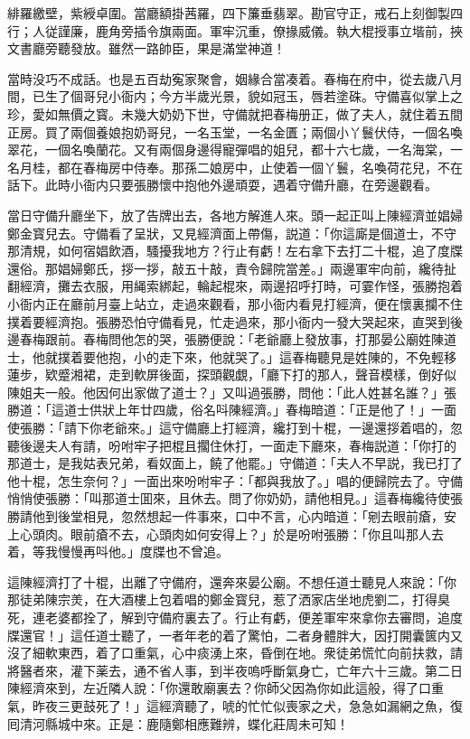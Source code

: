 緋羅繳壁，紫綬卓圍。當廳額掛茜羅，四下簾垂翡翠。勘官守正，戒石上刻御製四行；人従謹廉，鹿角旁插令旗兩面。軍牢沉重，僚掾威儀。執大棍授事立堦前，挾文書廳旁聽發放。雖然一路帥臣，果是滿堂神道！

當時没巧不成話。也是五百劫寃家聚會，姻緣合當凑着。春梅在府中，從去歲八月間，已生了個哥兒小衙内；今方半歲光景，貌如冠玉，唇若塗硃。守備喜似掌上之珍，愛如無價之寳。未幾大奶奶下世，守備就把春梅册正，做了夫人，就住着五間正房。買了兩個養娘抱奶哥兒，一名玉堂，一名金匱；兩個小丫鬟伏侍，一個名喚翠花，一個名喚蘭花。又有兩個身邊得寵彈唱的姐兒，都十六七歲，一名海棠，一名月桂，都在春梅房中侍奉。那孫二娘房中，止使着一個丫鬟，名喚荷花兒，不在話下。此時小衙内只要張勝懷中抱他外邊頑耍，遇着守備升廳，在旁邊觀看。

當日守備升廳坐下，放了告牌出去，各地方解進人來。頭一起正叫上陳經濟並娼婦鄭金寳兒去。守備看了呈狀，又見經濟面上帶傷，説道：「你這廝是個道士，不守那清規，如何宿娼飲酒，騷擾我地方？行止有虧！左右拿下去打二十棍，追了度牒還俗。那娼婦鄭氏，拶一拶，敲五十敲，責令歸院當差。」兩邊軍牢向前，纔待扯翻經濟，攤去衣服，用䋲索綁起，輪起棍來，兩邊招呼打時，可霎作怪，張勝抱着小衙内正在廳前月臺上站立，走過來觀看，那小衙内看見打經濟，便在懷裏攔不住撲着要經濟抱。張勝恐怕守備看見，忙走過來，那小衙内一發大哭起來，直哭到後邊春梅跟前。春梅問他怎的哭，張勝便說：「老爺廳上發放事，打那晏公廟姓陳道士，他就撲着要他抱，小的走下來，他就哭了。」這春梅聽見是姓陳的，不免輕移蓮步，欵蹙湘裙，走到軟屏後面，探頭觀覷，「廳下打的那人，聲音模樣，倒好似陳姐夫一般。他因何出家做了道士？」又叫過張勝，問他：「此人姓甚名誰？」張勝道：「這道士供狀上年廿四歲，俗名呌陳經濟。」春梅暗道：「正是他了！」一面使張勝：「請下你老爺來。」這守備廳上打經濟，纔打到十棍，一邊還拶着唱的，忽聽後邊夫人有請，吩咐牢子把棍且擱住休打，一面走下廳來，春梅説道：「你打的那道士，是我姑表兄弟，看奴面上，饒了他罷。」守備道：「夫人不早説，我已打了他十棍，怎生奈何？」一面出來吩咐牢子：「都與我放了。」唱的便歸院去了。守備悄悄使張勝：「叫那道士囬來，且休去。問了你奶奶，請他相見。」這春梅纔待使張勝請他到後堂相見，忽然想起一件事來，口中不言，心内暗道：「剜去眼前瘡，安上心頭肉。眼前瘡不去，心頭肉如何安得上？」於是吩咐張勝：「你且叫那人去着，等我慢慢再呌他。」度牒也不曾追。

這陳經濟打了十棍，出離了守備府，還奔來晏公廟。不想任道士聽見人來說：「你那徒弟陳宗羙，在大酒樓上包着唱的鄭金寳兒，惹了洒家店坐地虎劉二，打得臭死，連老婆都拴了，解到守備府裏去了。行止有虧，便差軍牢來拿你去審問，追度牒還官！」這任道士聽了，一者年老的着了驚怕，二者身體胖大，因打開囊篋内又沒了細軟東西，着了口重氣，心中痰湧上來，昏倒在地。衆徒弟慌忙向前扶救，請將醫者來，灌下薬去，通不省人事，到半夜嗚呼斷氣身亡，亡年六十三歲。第二日陳經濟來到，左近隣人說：「你還敢廟裏去？你師父因為你如此這般，得了口重氣，昨夜三更鼓死了！」這經濟聽了，唬的忙忙似喪家之犬，急急如漏網之魚，復囘清河縣城中來。正是：鹿隨鄭相應難辨，蝶化莊周未可知！

